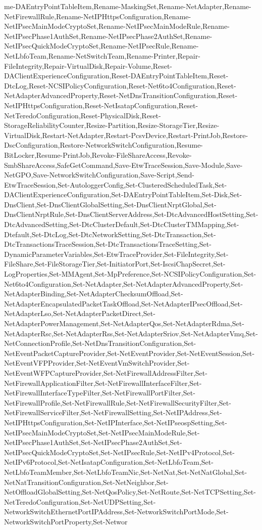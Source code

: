 {{me-DAEntryPointTableItem,Rename-MaskingSet,Rename-NetAdapter,Rename-NetFirewallRule,Rename-NetIPHttpsConfiguration,Rename-NetIPsecMainModeCryptoSet,Rename-NetIPsecMainModeRule,Rename-NetIPsecPhase1AuthSet,Rename-NetIPsecPhase2AuthSet,Rename-NetIPsecQuickModeCryptoSet,Rename-NetIPsecRule,Rename-NetLbfoTeam,Rename-NetSwitchTeam,Rename-Printer,Repair-FileIntegrity,Repair-VirtualDisk,Repair-Volume,Reset-DAClientExperienceConfiguration,Reset-DAEntryPointTableItem,Reset-DtcLog,Reset-NCSIPolicyConfiguration,Reset-Net6to4Configuration,Reset-NetAdapterAdvancedProperty,Reset-NetDnsTransitionConfiguration,Reset-NetIPHttpsConfiguration,Reset-NetIsatapConfiguration,Reset-NetTeredoConfiguration,Reset-PhysicalDisk,Reset-StorageReliabilityCounter,Resize-Partition,Resize-StorageTier,Resize-VirtualDisk,Restart-NetAdapter,Restart-PcsvDevice,Restart-PrintJob,Restore-DscConfiguration,Restore-NetworkSwitchConfiguration,Resume-BitLocker,Resume-PrintJob,Revoke-FileShareAccess,Revoke-SmbShareAccess,SafeGetCommand,Save-EtwTraceSession,Save-Module,Save-NetGPO,Save-NetworkSwitchConfiguration,Save-Script,Send-EtwTraceSession,Set-AutologgerConfig,Set-ClusteredScheduledTask,Set-DAClientExperienceConfiguration,Set-DAEntryPointTableItem,Set-Disk,Set-DnsClient,Set-DnsClientGlobalSetting,Set-DnsClientNrptGlobal,Set-DnsClientNrptRule,Set-DnsClientServerAddress,Set-DtcAdvancedHostSetting,Set-DtcAdvancedSetting,Set-DtcClusterDefault,Set-DtcClusterTMMapping,Set-Dtefault,Set-DtcLog,Set-DtcNetworkSetting,Set-DtcTransaction,Set-DtcTransactionsTraceSession,Set-DtcTransactionsTraceSetting,Set-DynamicParameterVariables,Set-EtwTraceProvider,Set-FileIntegrity,Set-FileShare,Set-FileStorageTier,Set-InitiatorPort,Set-IscsiChapSecret,Set-LogProperties,Set-MMAgent,Set-MpPreference,Set-NCSIPolicyConfiguration,Set-Net6to4Configuration,Set-NetAdapter,Set-NetAdapterAdvancedProperty,Set-NetAdapterBinding,Set-NetAdapterChecksumOffload,Set-NetAdapterEncapsulatedPacketTaskOffload,Set-NetAdapterIPsecOffload,Set-NetAdapterLso,Set-NetAdapterPacketDirect,Set-NetAdapterPowerManagement,Set-NetAdapterQos,Set-NetAdapterRdma,Set-NetAdapterRsc,Set-NetAdapterRss,Set-NetAdapterSriov,Set-NetAdapterVmq,Set-NetConnectionProfile,Set-NetDnsTransitionConfiguration,Set-NetEventPacketCaptureProvider,Set-NetEventProvider,Set-NetEventSession,Set-NetEventVFPProvider,Set-NetEventVmSwitchProvider,Set-NetEventWFPCaptureProvider,Set-NetFirewallAddressFilter,Set-NetFirewallApplicationFilter,Set-NetFirewallInterfaceFilter,Set-NetFirewallInterfaceTypeFilter,Set-NetFirewallPortFilter,Set-NetFirewallProfile,Set-NetFirewallRule,Set-NetFirewallSecurityFilter,Set-NetFirewallServiceFilter,Set-NetFirewallSetting,Set-NetIPAddress,Set-NetIPHttpsConfiguration,Set-NetIPInterface,Set-NetIPseospSetting,Set-NetIPsecMainModeCryptoSet,Set-NetIPsecMainModeRule,Set-NetIPsecPhase1AuthSet,Set-NetIPsecPhase2AuthSet,Set-NetIPsecQuickModeCryptoSet,Set-NetIPsecRule,Set-NetIPv4Protocol,Set-NetIPv6Protocol,Set-NetIsatapConfiguration,Set-NetLbfoTeam,Set-NetLbfoTeamMember,Set-NetLbfoTeamNic,Set-NetNat,Set-NetNatGlobal,Set-NetNatTransitionConfiguration,Set-NetNeighbor,Set-NetOffloadGlobalSetting,Set-NetQosPolicy,Set-NetRoute,Set-NetTCPSetting,Set-NetTeredoConfiguration,Set-NetUDPSetting,Set-NetworkSwitchEthernetPortIPAddress,Set-NetworkSwitchPortMode,Set-NetworkSwitchPortProperty,Set-Networ}}
